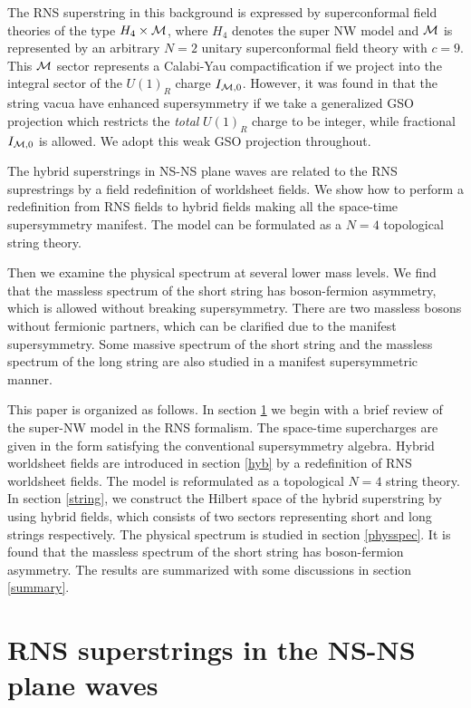 \documentclass[a4paper,seceq,preprint]{ptptex}
\begin{document}
The RNS superstring in this background is expressed
by superconformal field theories of the type
${H_4\times{\cal M}}$, where $H_4$ denotes the super NW
model and ${\cal M}$ is represented by an arbitrary $N=2$ 
unitary superconformal field theory 
with $c=9$.\cite{HS2}
This ${\cal M}$ sector represents a Calabi-Yau compactification 
if we project into the integral sector of the $U(1)_R$
charge $I_{{\cal M},0}$.
However, it was found in  that 
the string vacua have enhanced supersymmetry if we take 
a generalized GSO projection which restricts the {\it total} 
$U(1)_R$ charge to be integer, while fractional $I_{{\cal M},0}$
is allowed. We adopt this weak GSO projection throughout. 

The hybrid superstrings in NS-NS plane waves are
related to the RNS suprestrings by a field redefinition of
worldsheet fields. We show how to perform
a redefinition from RNS fields to hybrid fields 
making all the space-time supersymmetry manifest. 
The model can be formulated as a $N=4$ topological string theory.\cite{BV} 

Then we examine the physical spectrum at several lower mass levels.
We find that the massless spectrum of the short string
has boson-fermion asymmetry, which is allowed without breaking
supersymmetry. There are two massless bosons without fermionic
partners, which can be clarified due to the manifest 
supersymmetry. Some massive spectrum of the short string 
and the massless spectrum of the long string 
are also studied in a manifest supersymmetric manner.

This paper is organized as follows. In section \ref{nsr} 
we begin with a brief review of the super-NW model 
in the RNS formalism. The space-time supercharges 
are given in the form satisfying the conventional 
supersymmetry algebra.
Hybrid worldsheet fields are introduced
in section \ref{hyb} by a redefinition of RNS worldsheet 
fields. The model is reformulated as a topological $N=4$ 
string theory.
In section \ref{string}, we construct the Hilbert space 
of the hybrid superstring by using hybrid fields, 
which consists of two sectors representing short and long 
strings respectively. The physical spectrum is studied 
in section \ref{physspec}. It is found that the massless 
spectrum of the short string has boson-fermion asymmetry. 
The results are summarized with some discussions 
in section \ref{summary}.

\section{RNS superstrings in the NS-NS plane waves}\label{nsr}
\end{document}
